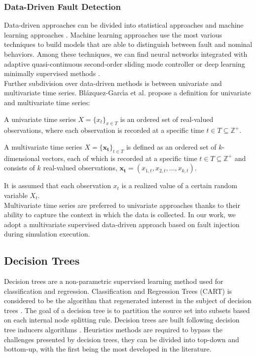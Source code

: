 \documentclass[../../Thesis.tex]{subfiles}
\begin{document}
	 	\subsubsection{Data-Driven Fault Detection}
	 		Data-driven approaches can be divided into statistical approaches and machine learning approaches \cite{Khalastchi2018}.  Machine learning approaches use the most various techniques to build models that are able to distinguish between fault and nominal behaviors. Among these techniques, we can find neural networks integrated with adaptive quasi-continuous second-order sliding mode controller \cite{MienVan2015} or deep learning minimally supervised methods \cite{Azzalini2021}. \\
	 		Further subdivision over data-driven methods is between univariate and multivariate time series. Bl{\'{a}}zquez{-}Garc{\'{\i}}a et al. \cite{Balzquez2020} propose a definition for univariate and multivariate time series:
	 		\begin{definition}
	 			A univariate time series $X = \lbrace x_t \rbrace_{x \in T}$ is an ordered set of real-valued observations, where each observation is recorded at a specific time $t \in T \subseteq \mathbb{Z}^+$.
	 		\end{definition}
	 		\begin{definition}
	 			A multivariate time series $X = \lbrace \mathbf{x_t} \rbrace_{t \in T}$ is defined as an ordered set of $k$-dimensional vectors, each of which is recorded at a specific time $t \in T \subseteq \mathbb{Z}^+$ and consists of $k$ real-valued observations,  $\mathbf{x_t} = \left( x_{1,t}, x_{2, t}, \dots, x_{k, t} \right)$.
	 		\end{definition}
	 		It is assumed that each observation $x_t$ is a realized value of a certain random variable $X_t$. \\
	 		Multivariate time series are preferred to univariate approaches thanks to their ability to capture the context in which the data is collected. 
	 		In our work, we adopt a multivariate supervised data-driven approach based on fault injection during simulation execution.  		
			
	 	\subsection{Decision Trees}
	 		Decision trees are a non-parametric supervised learning method used for classification and regression. Classification and Regression Trees (CART) \cite{BreFriOlsSto84a} is considered to be the algorithm that regenerated interest in the subject of decision trees \cite{Loh2011}. The goal of a decision tree is to partition the source set into subsets based on each internal node splitting rule.  Decision trees are built following decision tree inducers algorithms \cite{Rokach2005}. Heuristics methods are required to bypass the challenges presented by decision trees, they can be divided into top-down and bottom-up, with the first being the most developed in the literature. 
\end{document}
